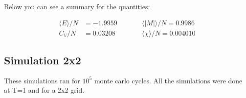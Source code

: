 Below you can see a summary for the quantities:

\begin{align*}
    \langle E \rangle /N &= -1.9959  \qquad &&\langle |M| \rangle /N = 0.9986
    \\
    C_V/N &= 0.03208  \qquad &&\langle \chi \rangle / N = 0.004010
\end{align*}
























\pagebreak
\subsection{Simulation 2x2}

These simulations ran for $10^5$ monte carlo cycles. All the simulations were done at T=1 and for a 2x2 grid.

